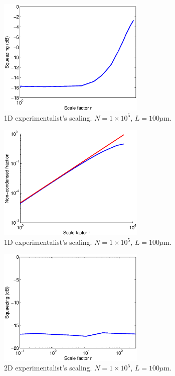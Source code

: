 \documentclass{iopart}
\begin{document}

\begin{figure}
  \centering
   \includegraphics[width=7cm]{figures/1D_squeezing_scaling.eps}
\caption{1D experimentalist's scaling. $N=1\times 10^5$, $L=100\mu$m.}
 \label{fig1D_squeezing_scaling}
\end{figure}

\begin{figure}
  \centering
   \includegraphics[width=7cm]{figures/1D_Bog_mode_occupation_scaling.eps}
\caption{1D experimentalist's scaling. $N=1\times 10^5$, $L=100\mu$m.}
 \label{fig1D_Bog_mode_occupation_scaling}
\end{figure}

\begin{figure}
  \centering
   \includegraphics[width=7cm]{figures/2D_squeezing_scaling.eps}
\caption{2D experimentalist's scaling. $N=1\times 10^5$, $L=100\mu$m.}
 \label{fig2D_squeezing_scaling}
\end{figure}
\end{document}
